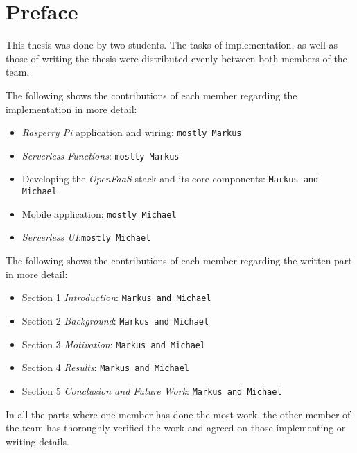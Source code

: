 \section*{Preface}

This thesis was done by two students. The tasks of implementation, as well as those of writing the
thesis were distributed evenly between both members of the team.

The following shows the contributions of each member regarding the implementation in more detail:

\begin{itemize}
  \setlength\itemsep{-1em}
  \item \textit{Rasperry Pi} application and wiring: \texttt{mostly Markus}
  \item \textit{Serverless Functions}: \texttt{mostly Markus}
  \item Developing the \textit{OpenFaaS} stack and its core components: \texttt{Markus and Michael}
  \item Mobile application: \texttt{mostly Michael}
  \item \textit{Serverless UI}:\texttt{mostly Michael}
\end{itemize}

The following shows the contributions of each member regarding the written part in more detail:

\begin{itemize}
  \setlength\itemsep{-1em}
  \item Section 1 \textit{Introduction}: \texttt{Markus and Michael}
  \item Section 2 \textit{Background}: \texttt{Markus and Michael}
  \item Section 3 \textit{Motivation}: \texttt{Markus and Michael}
  \item Section 4 \textit{Results}: \texttt{Markus and Michael}
  \item Section 5 \textit{Conclusion and Future Work}: \texttt{Markus and Michael}
\end{itemize}

In all the parts where one member has done the most work, the other member of the team has
thoroughly verified the work and agreed on those implementing or writing details.
